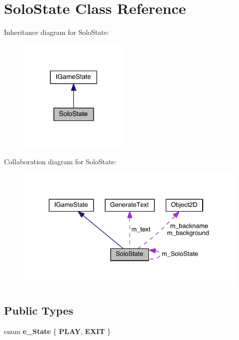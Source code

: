 \hypertarget{class_solo_state}{}\section{Solo\+State Class Reference}
\label{class_solo_state}


Inheritance diagram for Solo\+State\+:\nopagebreak
\begin{figure}[H]
\begin{center}
\leavevmode
\includegraphics[width=150pt]{class_solo_state__inherit__graph}
\end{center}
\end{figure}


Collaboration diagram for Solo\+State\+:\nopagebreak
\begin{figure}[H]
\begin{center}
\leavevmode
\includegraphics[width=333pt]{class_solo_state__coll__graph}
\end{center}
\end{figure}
\subsection*{Public Types}
\begin{DoxyCompactItemize}
\item 
\hypertarget{class_solo_state_a368f707ecad2d96a3e33436b03fd1ce2}{}enum {\bfseries e\+\_\+\+State} \{ {\bfseries P\+L\+A\+Y}, 
{\bfseries E\+X\+I\+T}
 \}\label{class_solo_state_a368f707ecad2d96a3e33436b03fd1ce2}

\end{DoxyCompactItemize}
